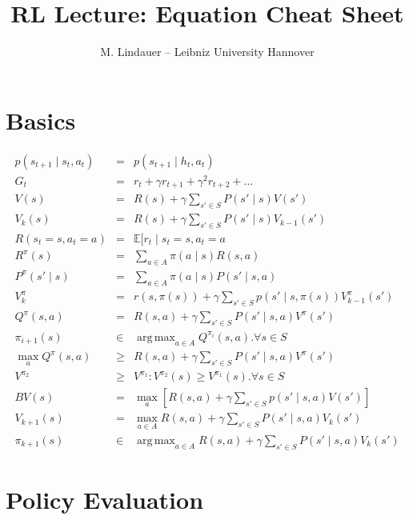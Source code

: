 \documentclass[]{article}
\title{RL Lecture: Equation Cheat Sheet}
\author{M. Lindauer -- Leibniz University Hannover}
\date{}
\DeclareMathOperator*{\argmax}{arg\,max}
\begin{document}
\maketitle

\section{Basics}

\begin{eqnarray}
	 p(s_{t+1} \mid s_t, a_t) &=& p(s_{t+1} \mid h_t, a_t) \\
	 G_t &=& r_t + \gamma r_{t+1} + \gamma^2 r_{t+2} + \ldots\\
	 V(s) &=& R(s) + \gamma \sum_{s' \in S} P(s'\mid s) V(s')\\
	 V_k(s) &=& R(s) + \gamma \sum_{s' \in S} P(s' \mid s) V_{k-1}(s')\\
	 R(s_t=s, a_t=a) &=& \mathbb{E}[r_t \mid s_t=s, a_t=a\\
	 R^\pi (s) &=& \sum_{a\in A} \pi(a\mid s ) R(s,a) \\
	 P^\pi (s'\mid s) &=& \sum_{a\in A} \pi(a \mid s) P(s' \mid s,a)\\
	 V^\pi_k  &=& r(s, \pi(s)) + \gamma \sum_{s'\in S} p(s'\mid s, \pi(s)) V_{k-1}^\pi (s')\\
	 Q^\pi(s,a) &=& R(s,a) + \gamma \sum_{s' \in S} P(s' \mid s,a) V^\pi(s')\\
	 \pi_{i+1}(s) &\in& \argmax_{a\in A} Q^{\pi_i} (s,a). \forall s \in S \\
    \max_a Q^\pi(s,a) &\geq& R(s,a) + \gamma \sum_{s' \in S} P(s' \mid s,a) V^\pi(s')\\
    V^{\pi_2} &\geq& V^{\pi_1}: V^{\pi_2}(s) \geq V^{\pi_1}(s). \forall s \in S\\
    BV(s) &=& \max_{a} [ R(s,a) + \gamma \sum_{s' \in S} p(s' \mid s,a)  V(s')  ]\\
    V_{k+1}(s) &=& \max_{a\in A } R(s,a) + \gamma \sum_{s' \in S } P(s' \mid s,a) V_k(s') \\
    \pi_{k+1}(s) &\in& \argmax_{a \in A} R(s,a) + \gamma \sum_{s' \in S} P(s' \mid s,a) V_k(s')
\end{eqnarray}

\newpage
\section{Policy Evaluation}
\end{document}
